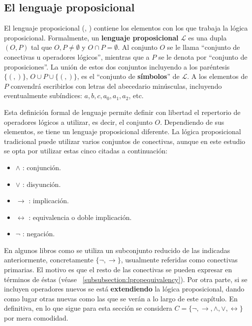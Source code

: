 \subsection{El lenguaje proposicional}\label{subsection:lproplenguaje}
El lenguaje proposicional (\cite{miranda2023logica},\cite[Capítulo 8]{monk1976mathematical} ) contiene los elementos con los que trabaja la lógica proposicional. Formalmente, un \textbf{lenguaje proposicional} $\mathcal{L}$ es una dupla $(O,P)$ tal que $O,P \neq \emptyset$ y $O \cap P = \emptyset$. Al conjunto $O$ se le llama ``conjunto de conectivas u operadores lógicos'', mientras que a $P$ se le denota por ``conjunto de proposiciones''. La unión de estos dos conjuntos incluyendo a los paréntesis $\lbrace (,) \rbrace$, $O \cup P \cup \lbrace (,) \rbrace$, es el ``conjunto de \textbf{símbolos}'' de $\mathcal{L}$. A los elementos de $P$ convendrá escribirlos con letras del abecedario minúsculas, incluyendo eventualmente subíndices: $a,b,c,a_0,a_1,a_2$, etc.

Esta definición formal de lenguaje permite definir con libertad el repertorio de operadores lógicos a utilizar, es decir, el conjunto $O$. Dependiendo de sus elementos, se tiene un lenguaje proposicional diferente. La lógica proposicional tradicional puede utilizar varios conjuntos de conectivas, aunque en este estudio se opta por utilizar estas cinco citadas a continuación:

\begin{itemize}
    \item $\land$ : conjunción.
    \item $\lor$ : disyunción.
    \item $\rightarrow$ : implicación.
    \item $\leftrightarrow$ : equivalencia o doble implicación.
    \item $\neg$ : negación.
\end{itemize}

En algunos libros como \cite[Capítulo 8]{monk1976mathematical} se utiliza un subconjunto reducido de las indicadas anteriormente, concretamente $\lbrace \neg, \rightarrow \rbrace$, usualmente referidas como conectivas primarias. El motivo es que el resto de las conectivas se pueden expresar en términos de éstas (véase ~\ref{subsubsection:lpropequivalency}). Por otra parte, si se incluyen operadores nuevos se está \textbf{extendiendo} la lógica proposicional, dando como lugar otras nuevas como las que se verán a lo largo de este capítulo. En definitiva, en lo que sigue para esta sección se considera $C = \lbrace \neg, \rightarrow, \land, \lor, \leftrightarrow \rbrace$ por mera comodidad.

